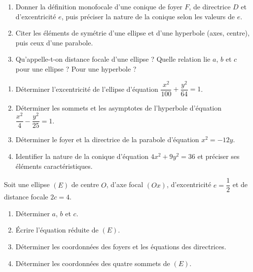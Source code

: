 \documentclass[11pt]{article}
\newcommand{\cle}[1]{{\popxbold\color{popdark}#1}}
\newcounter{popsec}
\newcounter{popsub}
\newcommand{\courssub}[1]{%
  \stepcounter{popsub}%
  \par\vspace{9pt}\noindent{\popxbold\fontsize{11.5}{13}\selectfont\color{popink}{\color{poporange}\thepopsec.\thepopsub}\hspace{6pt}#1}\par\nopagebreak\vspace{4pt}
}
\begin{document}
\begin{exercice}
\begin{enumerate}
\item Donner la définition monofocale d'une conique de foyer $F$, de directrice $D$ et d'excentricité $e$, puis préciser la nature de la conique selon les valeurs de $e$.
\item Citer les éléments de symétrie d'une ellipse et d'une hyperbole (axes, centre), puis ceux d'une parabole.
\item Qu'appelle-t-on \cle{distance focale} d'une ellipse ? Quelle relation lie $a$, $b$ et $c$ pour une ellipse ? Pour une hyperbole ?
\end{enumerate}
\end{exercice}

\begin{exercice}
\begin{enumerate}
\item Déterminer l'excentricité de l'ellipse d'équation $\dfrac{x^{2}}{100} + \dfrac{y^{2}}{64} = 1$.
\item Déterminer les sommets et les asymptotes de l'hyperbole d'équation $\dfrac{x^{2}}{4} - \dfrac{y^{2}}{25} = 1$.
\item Déterminer le foyer et la directrice de la parabole d'équation $x^{2} = -12y$.
\item Identifier la nature de la conique d'équation $4x^{2} + 9y^{2} = 36$ et préciser ses éléments caractéristiques.
\end{enumerate}
\end{exercice}

\courssub{Je m'entraîne}

\begin{exercice}
Soit une ellipse $(E)$ de centre $O$, d'axe focal $(Ox)$, d'excentricité $e = \dfrac{1}{2}$ et de distance focale $2c = 4$.
\begin{enumerate}
\item Déterminer $a$, $b$ et $c$.
\item Écrire l'équation réduite de $(E)$.
\item Déterminer les coordonnées des foyers et les équations des directrices.
\item Déterminer les coordonnées des quatre sommets de $(E)$.
\end{enumerate}
\end{exercice}
\end{document}
